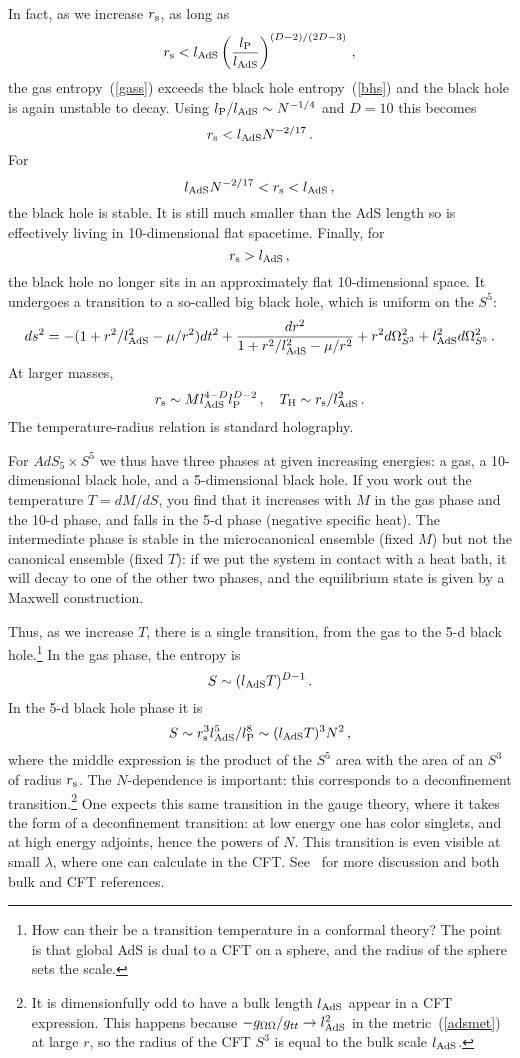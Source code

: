 \documentclass[12pt]{article}
\newcommand{\be}{\begin{equation}}
\newcommand{\ee}{\end{equation}}
\newcommand{\rmx}{\rm}
\newcommand{\rs}{r_{\rmx s}}
\newcommand{\lp}{l_{\rmx P}}
\newcommand{\la}{l_{\rm AdS}}
\begin{document}
In fact, as we increase $\rs$, as long as 
\be
\rs <  l_{\rm AdS} \left(\frac{l_{\rmx P}}{l_{\rm AdS} }\right)^{(D-2)/(2D-3)} \,,
\ee
the gas entropy~(\ref{gass}) exceeds the black hole entropy~(\ref{bhs}) and the black hole is again unstable to decay.  Using ${l_{\rmx P}}/l_{\rm AdS} \sim N^{-1/4}$ and $D = 10$ this becomes
\be
\rs <  l_{\rm AdS} N^{-2/17} \,.
\ee
For
\be
l_{\rm AdS} N^{-2/17} < \rs <  l_{\rm AdS} \,,
\ee
the black hole is stable.  It is still much smaller than the AdS length so is effectively living in 10-dimensional flat spacetime.  Finally, for 
\be
\rs > l_{\rmx AdS}\,,
\ee
the black hole no longer sits in an approximately flat 10-dimensional space.  It undergoes a transition to a so-called big black hole, which is uniform on the $S^5$:
\be
ds^2 = -(1 + r^2/l_{\rm AdS}^2 - \mu/r^2) dt^2 + \frac{ dr^2}{1 + r^2/l_{\rm AdS}^2 -\mu/r^2} + r^2 d\Omega^2_{S^3} + l_{\rm AdS}^2 d\Omega^2_{S^5} \,. \label{bbh}
\ee
At larger masses,
\be
\rs \sim M l_{\rm AdS}^{4-D}  \lp^{D-2} \,,\quad T_{\rmx H} \sim \rs/\la^2 \,.
\ee
The temperature-radius relation is standard holography.

For $AdS_5 \times S^5$ we thus have three phases at given increasing energies: a gas, a 10-dimensional black hole, and a 5-dimensional black hole.  If you work out the temperature $T = dM/dS$, you find that it increases with $M$ in the gas phase and the 10-d phase, and falls in the 5-d phase (negative specific heat).  The intermediate phase is stable in the microcanonical ensemble (fixed $M$) but not the canonical ensemble (fixed $T$): if we put the system in contact with a heat bath, it will decay to one of the other two phases, and the equilibrium state is given by a Maxwell construction.  

Thus, as we increase $T$, there is a single transition, from the gas to the 5-d black hole.\footnote{How can their be a transition temperature in a conformal theory?  The point is that global AdS is dual to a CFT on a sphere, and the radius of the sphere sets the scale.}
In the gas phase, the entropy is 
\be
S \sim (\la T )^{D-1} \,.
\ee
In the 5-d black hole phase it is
\be
S \sim \rs^3 \la^5 /\lp^8 \sim (\la T )^3 N^2\,,
\ee
where the middle expression is the product of the $S^5$ area with the area of an $S^3$ of radius $\rs$.  The $N$-dependence is important: this corresponds to a deconfinement transition.\footnote{It is dimensionfully odd to have a  bulk length $\la$ appear in a CFT expression.  This happens because $-g_{\Omega\Omega} / g_{tt} \to  \la^2$ in the metric~(\ref{adsmet}) at large $r$, so the radius of the CFT $S^3$ is equal to the bulk scale $\la$.}  One expects this same transition in the gauge theory, where it takes the form of a deconfinement transition: at low energy one has color singlets, and at high energy adjoints, hence the powers of $N$.  This transition is even visible at small $\lambda$, where one can calculate in the CFT.  See~\cite{Witten:1998zw} for more discussion and both bulk and CFT references. 
\end{document}
